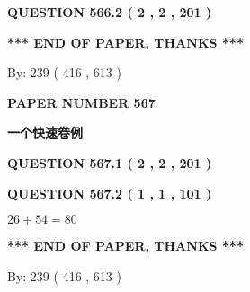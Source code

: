 \documentclass{ctexart}
\begin{document}
 
  
\vspace{0.2in}
  
{\textbf{\Large{QUESTION
566.2 
 ( 2 , 2 , 201 )
}}}
  
  
   
   
 \vspace{0.2in}
 
   
   
   
   
\vspace{1.0in} 
{\textbf{\large{ *** END OF PAPER, THANKS *** }}} 
   
   
\hspace{1.0in} By: 
 239 ( 416 ,  613 )
   
   
   
   
\newpage 
\setcounter{page}{ 
   567001 } 
   
   
   
   
 {\textbf{ \Large{ PAPER NUMBER  567  }}}
   
   
\vspace{0.2in}
   
   
   
   
   
   
 \vspace{0.2in}
{\LARGE {\textbf{ 一个快速卷例}}}
   
   
  
\vspace{0.2in}
  
{\textbf{\Large{QUESTION
567.1 
 ( 2 , 2 , 201 )
}}}
  
  
  
\vspace{0.2in}
  
{\textbf{\Large{QUESTION
567.2 
 ( 1 , 1 , 101 )
}}}
  
  
 
 

$ %
26 +  %
54=   %
80$
 
 
   
   
 \vspace{0.2in}
 
   
   
   
   
\vspace{1.0in} 
{\textbf{\large{ *** END OF PAPER, THANKS *** }}} 
   
   
\hspace{1.0in} By: 
 239 ( 416 ,  613 )
   
\end{document}
